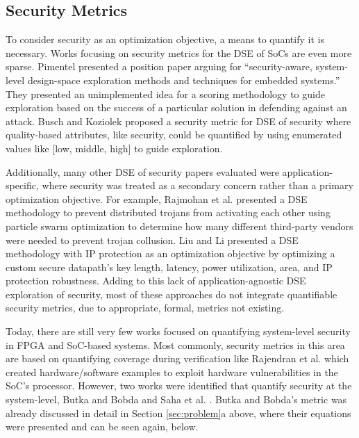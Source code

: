 \subsection{Security Metrics}
To consider security as an optimization objective, a means to quantify it is necessary. Works focusing on security metrics for the DSE of SoCs are even more sparse.
Pimentel \cite{pimentel_case_2020} presented a position paper arguing for “security-aware, system-level design-space exploration methods and techniques for embedded systems.” They presented an unimplemented idea for a scoring methodology to guide exploration based on the success of a particular solution in defending against an attack. 
Busch and Koziolek \cite{busch_considering_2016} proposed a security metric for DSE of security where quality-based attributes, like security, could be quantified by using enumerated values like [low, middle, high] to guide exploration. 

Additionally, many other DSE of security papers evaluated were application-specific, where security was treated as a secondary concern rather than a primary optimization objective. For example, Rajmohan et al. \cite{rajmohan_hybrid_2020} presented a DSE methodology to prevent distributed trojans from activating each other using particle swarm optimization to determine how many different third-party vendors were needed to prevent trojan collusion. Liu and Li \cite{liu_hardware_2015} presented a DSE methodology with IP protection as an optimization objective by optimizing a custom secure datapath's key length, latency, power utilization, area, and IP protection robustness. Adding to this lack of application-agnostic DSE exploration of security, most of these approaches do not integrate quantifiable security metrics, due to appropriate, formal, metrics not existing.

Today, there are still very few works focused on quantifying system-level security in FPGA and SoC-based systems. Most commonly, security metrics in this area are based on quantifying coverage during verification like Rajendran et al. \cite{rajendran_hunter_2023, rajendran_exploring_2024} which created hardware/software examples to exploit hardware vulnerabilities in the SoC's processor. However, two works were identified that quantify security at the system-level, Butka and Bobda \cite{butka_measuring_2025} and Saha et al. \cite{saha_metrics_2022}. Butka and Bobda's metric was already discussed in detail in Section \ref{sec:problem}a above, where their equations were presented and can be seen again, below.


